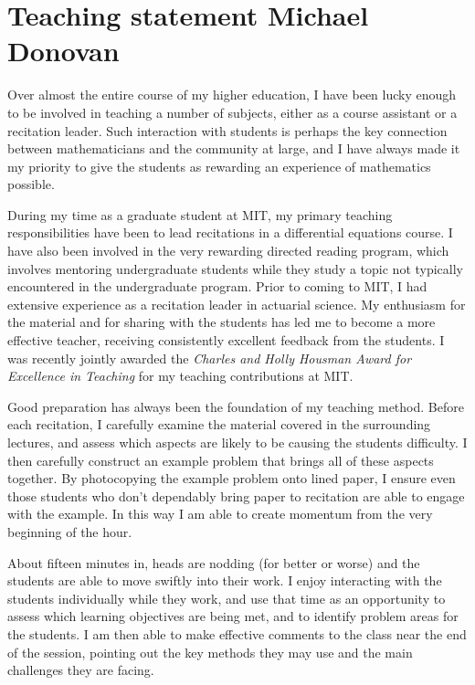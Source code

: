 \documentclass[11pt]{article}
\begin{document}
\section*{\huge Teaching statement \hfill\normalsize Michael Donovan}
\pagestyle{empty}

Over almost the entire course of my higher education, I have been lucky enough to be involved in teaching a number of subjects, either as a course assistant or a recitation leader. Such interaction with students is perhaps the key connection between mathematicians and the community at large, and I have always made it my priority to give the students as rewarding an experience of mathematics possible.

During my time as a graduate student at MIT, my primary teaching responsibilities have been to lead recitations in a differential equations course. I have also been involved in the very rewarding directed reading program, which involves mentoring undergraduate students while they study a topic not typically encountered in the undergraduate program. Prior to coming to MIT, I had extensive experience as a recitation leader in actuarial science. My enthusiasm for the material and for sharing with the students has led me to become a more effective teacher, receiving consistently excellent feedback from the students. I was recently jointly awarded the \emph{Charles and Holly Housman Award for Excellence in Teaching} for my teaching contributions at MIT.



Good preparation has always been the foundation of my teaching method. Before each recitation, I carefully examine the material covered in the surrounding lectures, and assess which aspects are likely to be causing the students difficulty. I then carefully construct an example problem that brings all of these aspects together. By photocopying the example problem onto lined paper, I ensure even those students who don't dependably bring paper to recitation are able to engage with the example. In this way I am able to create momentum from the very beginning of the hour.

About fifteen minutes in, heads are nodding (for better or worse) and the students are able to move swiftly into their work. I enjoy interacting with the students individually while they work, and use that time as an opportunity to assess which learning objectives are being met, and to identify problem areas for the students. I am then able to make effective comments to the class near the end of the session, pointing out the key methods they may use and the main challenges they are facing.
\end{document}
